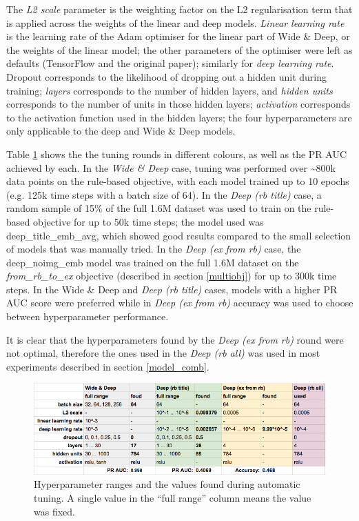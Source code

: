 The \textit{L2 scale} parameter is the weighting factor on the L2 regularisation term that is applied across the weights of the linear and deep models.
\textit{Linear learning rate} is the learning rate of the Adam optimiser for the linear part of Wide \& Deep, or the weights of the linear model; the other parameters of the optimiser were left as defaults (TensorFlow and the original paper); similarly for \textit{deep learning rate}.
Dropout corresponds to the likelihood of dropping out a hidden unit during training; \textit{layers} corresponds to the number of hidden layers, and \textit{hidden units} corresponds to the number of units in those hidden layers; \textit{activation} corresponds to the activation function used in the hidden layers; the four hyperparameters are only applicable to the deep and Wide \& Deep models.

Table \ref{tuning_rounds} shows the the tuning rounds in different colours, as well as the PR AUC achieved by each.
In the \textit{Wide \& Deep} case, tuning was performed over \textasciitilde800k data points on the rule-based objective, with each model trained up to 10 epochs (e.g. 125k time steps with a batch size of 64).
In the \textit{Deep (rb title)} case, a random sample of 15\% of the full 1.6M dataset was used to train on the rule-based objective for up to 50k time steps; the model used was deep\_title\_emb\_avg, which showed good results compared to the small selection of models that was manually tried.
In the \textit{Deep (ex from rb)} case, the deep\_noimg\_emb model was trained on the full 1.6M dataset on the \textit{from\_rb\_to\_ex} objective (described in section \ref{multiobj}) for up to 300k time steps.
In the {Wide \& Deep} and \textit{Deep (rb title)} cases, models with a higher PR AUC score were preferred while in \textit{Deep (ex from rb)} accuracy was used to choose between hyperparameter performance.

It is clear that the hyperparameters found by the \textit{Deep (ex from rb)} round were not optimal, therefore the ones used in the \textit{Deep (rb all)} was used in most experiments described in section \ref{model_comb}.

\begin{figure}
  \includegraphics[width=\linewidth]{figures/tuning_rounds}
  \caption{Hyperparameter ranges and the values found during automatic tuning. A single value in the ``full range'' column means the value was fixed.}
  \label{tuning_rounds}
\end{figure}

